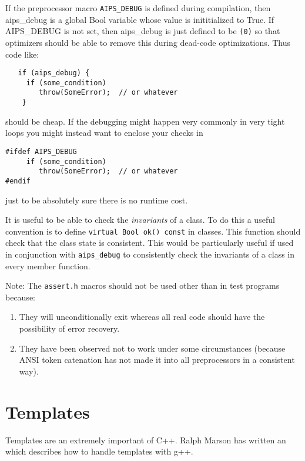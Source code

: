 If the preprocessor macro {\tt AIPS\_DEBUG} is defined during
compilation, then aips\_debug is a global Bool variable whose value is
inititialized to True. If AIPS\_DEBUG is not set, then aips\_debug is just
defined to be {\tt (0)} so that optimizers should be able to remove
this during dead-code optimizations. Thus code like:

\begin{verbatim}
   if (aips_debug) {
     if (some_condition)
        throw(SomeError);  // or whatever
    }
\end{verbatim}

should be cheap. If the debugging might happen very commonly in very
tight loops you might instead want to enclose your checks in
\begin{verbatim}
#ifdef AIPS_DEBUG
     if (some_condition)
        throw(SomeError);  // or whatever
#endif
\end{verbatim}
just to be absolutely sure there is no runtime cost.

It is useful to be able to check the {\em invariants} of a class. To do
this a useful convention is to define {\tt virtual Bool ok() const}
in classes. This function should check that the class state is
consistent. This would be particularly useful if used in conjunction
with {\tt aips\_debug} to consistently check the invariants of a class
in every member function.

Note: The {\tt assert.h} macros should not be used other than in test
programs because:
\begin{enumerate}
\item
They will unconditionally exit whereas all real code should have the
possibility of error recovery.
\item
They have been observed not to work under some circumstances (because
ANSI token catenation has not made it into all preprocessors in a
consistent way).
\end{enumerate}

\section{Templates}

Templates are an extremely important of C++.
Ralph Marson has written an
 which describes
how to handle templates with g++.
